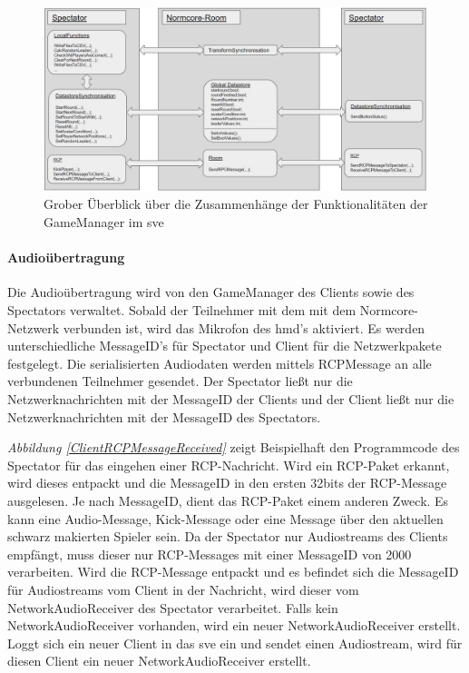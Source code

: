 \documentclass[a4paper,11pt]{article}%
\renewcommand{\\}{\vspace*{0.5\baselineskip} \newline}
\begin{document}
\begin{figure}[H]
		\begin{footnotesize}
		\centering
			\includegraphics[width=\textwidth]{Abbildungen/GameManagerClientSpectator.jpg}\\
			\caption[Abbildung 1]{Grober Überblick über die Zusammenhänge der Funktionalitäten der GameManager im \ac{sve}}
			\label{GameManagerClientSpectator}
		\end{footnotesize}
	\end{figure}

\paragraph{Audioübertragung}
Die Audioübertragung wird von den GameManager des Clients sowie des Spectators verwaltet. Sobald der Teilnehmer mit dem mit dem Normcore-Netzwerk verbunden ist, wird das Mikrofon des \ac{hmd}'s aktiviert. Es werden unterschiedliche MessageID's für Spectator und Client für die Netzwerkpakete festgelegt. Die serialisierten Audiodaten werden mittels RCPMessage an alle verbundenen Teilnehmer gesendet. Der Spectator ließt nur die Netzwerknachrichten mit der MessageID der Clients und der Client ließt nur die Netzwerknachrichten mit der MessageID des Spectators.

\textit{Abbildung \ref{ClientRCPMessageReceived}} zeigt Beispielhaft den Programmcode des Spectator für das eingehen einer RCP-Nachricht. Wird ein RCP-Paket erkannt, wird dieses entpackt und die MessageID in den ersten 32bits der RCP-Message ausgelesen. Je nach MessageID, dient das RCP-Paket einem anderen Zweck. Es kann eine Audio-Message, Kick-Message  oder eine Message über den aktuellen schwarz makierten Spieler sein. Da der Spectator nur Audiostreams des Clients empfängt, muss dieser nur RCP-Messages mit einer MessageID von \dq{}2000\dq{} verarbeiten. 
Wird die RCP-Message entpackt und es befindet sich die MessageID für Audiostreams vom Client  in der Nachricht, wird dieser vom \dq{}NetworkAudioReceiver\dq{} des Spectator verarbeitet.  Falls kein \dq{}NetworkAudioReceiver\dq{} vorhanden, wird ein neuer \dq{}NetworkAudioReceiver\dq{} erstellt. Loggt sich ein neuer Client in das \ac{sve} ein und sendet einen Audiostream, wird für diesen Client ein neuer \dq{}NetworkAudioReceiver\dq{} erstellt.
\end{document}

